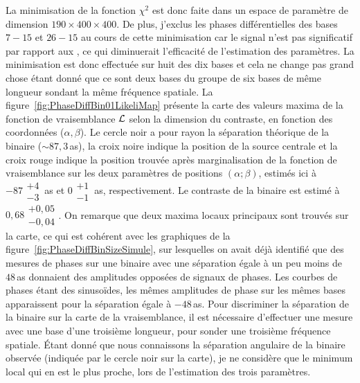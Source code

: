 La minimisation de la fonction $\chi^2$ est donc faite dans un espace de paramètre de dimension $190 \times 400 \times 400$. De plus, j'exclus les phases différentielles des bases $7-15$ et $26-15$ au cours de cette minimisation car le signal n'est pas significatif par rapport aux \wiggles, ce qui diminuerait l'efficacité de l'estimation des paramètres. La minimisation est donc effectuée sur huit des dix bases et cela ne change pas grand chose étant donné que ce sont deux bases du groupe de six bases de même longueur sondant la même fréquence spatiale. La figure~\ref{fig:PhaseDiffBin01LikeliMap} présente la carte des valeurs maxima de la fonction de vraisemblance $\mathcal{L}$ selon la dimension du contraste, en fonction des coordonnées ($\alpha, \beta$). Le cercle noir a pour rayon la séparation théorique de la binaire ($\sim 87,3\,$as), la croix noire indique la position de la source centrale et la croix rouge indique la position trouvée après marginalisation de la fonction de vraisemblance sur les deux paramètres de positions $(\alpha; \beta)$, estimés ici à $-87\substack{+4 \\ -3} \,$as et $0\substack{+1 \\ -1} \,$as, respectivement. Le contraste de la binaire est estimé à $0,68\substack{+0,05 \\ -0,04}$. On remarque que deux maxima locaux principaux sont trouvés sur la carte, ce qui est cohérent avec les graphiques de la figure~\ref{fig:PhaseDiffBinSizeSimule}, sur lesquelles on avait déjà identifié que des mesures de phases sur une binaire avec une séparation égale à un peu moins de $48 \,$as donnaient des amplitudes opposées de signaux de phases. Les courbes de phases étant des sinusoïdes, les mêmes amplitudes de phase sur les mêmes bases apparaissent pour la séparation égale à $-48 \,$as. Pour discriminer la séparation de la binaire sur la carte de la vraisemblance, il est nécessaire d'effectuer une mesure avec une base d'une troisième longueur, pour sonder une troisième fréquence spatiale. Étant donné que nous connaissons la séparation angulaire de la binaire observée (indiquée par le cercle noir sur la carte), je ne considère que le minimum local qui en est le plus proche, lors de l'estimation des trois paramètres.

